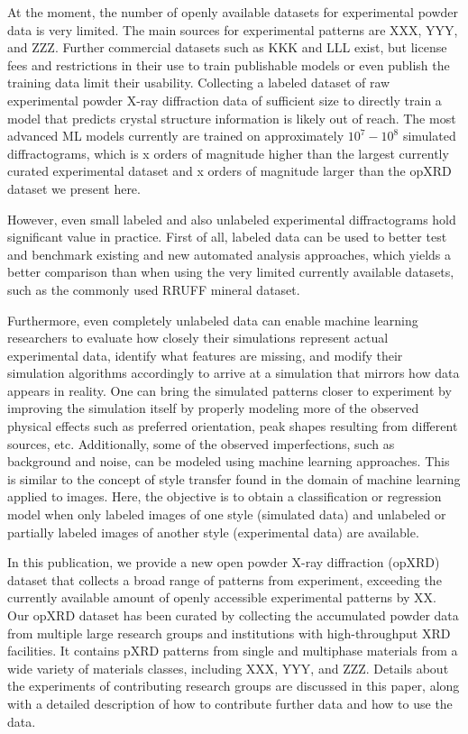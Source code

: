 At the moment, the number of openly available datasets for experimental powder data is very limited.
The main sources for experimental patterns are XXX, YYY, and ZZZ.
Further commercial datasets such as KKK and LLL exist, but license fees and restrictions in their use to train publishable models or even publish the training data limit their usability.
Collecting a labeled dataset of raw experimental powder X-ray diffraction data of sufficient size to directly train a model that predicts crystal structure information is likely out of reach.
The most advanced ML models currently are trained on approximately $10^7 - 10^8$ simulated diffractograms, which is x orders of magnitude higher than the largest currently curated experimental dataset and x orders of magnitude larger than the opXRD dataset we present here.

However, even small labeled and also unlabeled experimental diffractograms hold significant value in practice. First of all, labeled data can be used to better test and benchmark existing and new automated analysis approaches, which yields a better comparison than when using the very limited currently available datasets, such as the commonly used RRUFF mineral dataset.

Furthermore, even completely unlabeled data can enable machine learning researchers to evaluate how closely their simulations represent actual experimental data, identify what features are missing, and modify their simulation algorithms accordingly to arrive at a simulation that mirrors how data appears in reality.
One can bring the simulated patterns closer to experiment by improving the simulation itself by properly modeling more of the observed physical effects such as preferred orientation, peak shapes resulting from different sources, etc.
Additionally, some of the observed imperfections, such as background and noise, can be modeled using machine learning approaches.
This is similar to the concept of style transfer\cite{Gatys2016, Ganin2015} found in the domain of machine learning applied to images.
Here, the objective is to obtain a classification or regression model when only labeled images of one style (simulated data) and unlabeled or partially labeled images of another style (experimental data) are available.

In this publication, we provide a new open powder X-ray diffraction (opXRD) dataset that collects a broad range of patterns from experiment, exceeding the currently available amount of openly accessible experimental patterns by XX.
Our opXRD dataset has been curated by collecting the accumulated powder data from multiple large research groups and institutions with high-throughput XRD facilities. It contains pXRD patterns from single and multiphase materials from a wide variety of materials classes, including XXX, YYY, and ZZZ. Details about the experiments of contributing research groups are discussed in this paper, along with a detailed description of how to contribute further data and how to use the data.

